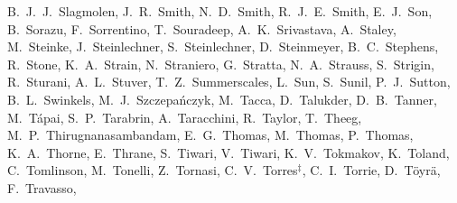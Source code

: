 {B.~J.~J.~Slagmolen,  %
J.~R.~Smith,  %
N.~D.~Smith,  %
R.~J.~E.~Smith,  %
E.~J.~Son,  %
B.~Sorazu,  %
F.~Sorrentino, %
T.~Souradeep,  %
A.~K.~Srivastava,  %
A.~Staley,  %
M.~Steinke,  %
J.~Steinlechner,  %
S.~Steinlechner,  %
D.~Steinmeyer,  %
B.~C.~Stephens,  %
R.~Stone,  %
K.~A.~Strain,  %
N.~Straniero, %
G.~Stratta, %
N.~A.~Strauss,  %
S.~Strigin,  %
R.~Sturani,  %
A.~L.~Stuver,  %
T.~Z.~Summerscales,  %
L.~Sun,  %
S.~Sunil,  %
P.~J.~Sutton,  %
B.~L.~Swinkels, %
M.~J.~Szczepa\'nczyk,  %
M.~Tacca, %
D.~Talukder,  %
D.~B.~Tanner,  %
M.~T\'apai,  %
S.~P.~Tarabrin,  %
A.~Taracchini,  %
R.~Taylor,  %
T.~Theeg,  %
M.~P.~Thirugnanasambandam,  %
E.~G.~Thomas,  %
M.~Thomas,  %
P.~Thomas,  %
K.~A.~Thorne,  %
E.~Thrane,  %
S.~Tiwari, %
V.~Tiwari,  %
K.~V.~Tokmakov,  %
K.~Toland, 	%
C.~Tomlinson,  %
M.~Tonelli, %
Z.~Tornasi,  %
C.~V.~Torres$^{\ddag}$,  %
C.~I.~Torrie,  %
D.~T\"oyr\"a,  %
F.~Travasso, %
}
